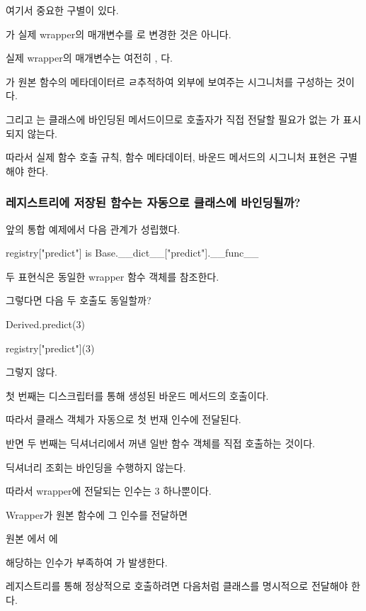 여기서 중요한 구별이 있다.

가 실제 wrapper의 매개변수를  로 변경한 것은 아니다.

실제 wrapper의 매개변수는 여전히 , 다.

가 원본 함수의 메타데이터르 ㄹ추적하여 외부에 보여주는 시그니처를 구성하는 것이다.

그리고 는 클래스에 바인딩된 메서드이므로 호출자가 직접 전달할 필요가 없는 가 표시되지 않는다.

따라서 실제 함수 호출 규칙, 함수 메타데이터, 바운드 메서드의 시그니처 표현은 구별해야 한다.

\subsubsection{레지스트리에 저장된 함수는 자동으로 클래스에 바인딩될까?}

앞의 통합 예제에서 다음 관계가 성립했다.

\begin{dhkcode}
registry["predict"] is Base.__dict__["predict"].__func__
\end{dhkcode}

두 표현식은 동일한 wrapper 함수 객체를 참조한다.

그렇다면 다음 두 호출도 동일할까?

\begin{dhkcode}
Derived.predict(3)

registry["predict"](3)
\end{dhkcode}

그렇지 않다.

첫 번째는  디스크립터를 통해 생성된 바운드 메서드의 호출이다.

따라서  클래스 객체가 자동으로 첫 번재 인수에 전달된다.

반면 두 번째는 딕셔너리에서 꺼낸 일반 함수 객체를 직접 호출하는 것이다.

딕셔너리 조회는  바인딩을 수행하지 않는다.

따라서 wrapper에 전달되는 인수는 3 하나뿐이다.

Wrapper가 원본 함수에 그 인수를 전달하면

원본 에서 에 

해당하는 인수가 부족하여  가 발생한다.

레지스트리를 통해 정상적으로 호출하려면 다음처럼 클래스를 명시적으로 전달해야 한다.

